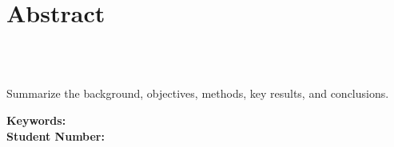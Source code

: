 \chapter*{Abstract}

\begin{center}
  {\large\bfseries \ThesisTitleEn\par}
  \vspace{4mm}
  \AuthorEn\\ \DepartmentEn\\ \UniversityEn
\end{center}
\vspace{6mm}

Summarize the background, objectives, methods, key results, and conclusions.

\vspace{6mm}
\noindent\textbf{Keywords:} \KeywordsEn\\
\noindent\textbf{Student Number:} \StudentID
\clearpage
